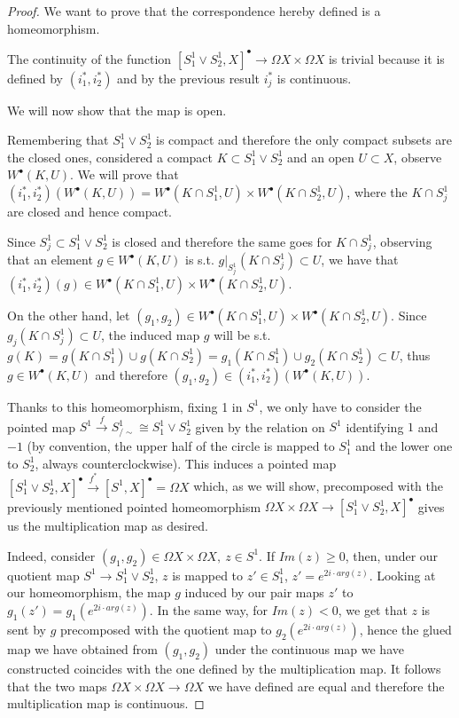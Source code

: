 \documentclass{article}
\begin{document}
\begin{proof}
	We want to prove that the correspondence hereby defined is a homeomorphism.
	
	The continuity of the function $[S^1_1\vee S^1_2,X]^{\bullet}\rightarrow\Omega X\times\Omega X$ is trivial because it is defined by $(i_1^*,i_2^*)$ and by the previous result $i_j^*$ is continuous.
	
	We will now show that the map is open.
	
	Remembering that $S^1_1\vee S^1_2$ is compact and therefore the only compact subsets are the closed ones, considered a compact $K\subset S^1_1\vee S^1_2$ and an open $U\subset X$, observe $W^{\bullet}(K,U)$. We will prove that $(i_1^*,i_2^*)(W^{\bullet}(K,U))=W^{\bullet}(K\cap S^1_1,U)\times W^{\bullet}(K\cap S^1_2,U)$, where the $K\cap S^1_j$ are closed and hence compact.
	
	Since $S^1_j\subset S^1_1\vee S^1_2$ is closed and therefore the same goes for $K\cap S^1_j$, observing that an element $g\in W^{\bullet}(K,U)$ is s.t. $g|_{S^1_j}(K\cap S_j^1)\subset U$, we have that $(i_1^*,i_2^*)(g)\in W^{\bullet}(K\cap S^1_1,U)\times W^{\bullet}(K\cap S^1_2,U)$.
	
	On the other hand, let $(g_1,g_2)\in W^{\bullet}(K\cap S^1_1,U)\times W^{\bullet}(K\cap S^1_2,U)$. Since $g_j(K\cap S^1_j)\subset U$, the induced map $g$ will be s.t. $g(K)=g(K\cap S^1_1)\cup g(K\cap S^1_2)=g_1(K\cap S^1_1)\cup g_2(K\cap S^1_2)\subset U$, thus $g\in W^{\bullet}(K,U)$ and therefore $(g_1,g_2)\in (i_1^*,i_2^*)(W^{\bullet}(K,U))$.
	
	Thanks to this homeomorphism, fixing 1 in $S^1$, we only have to consider the pointed map $S^1\xrightarrow{f} S^1_{/\sim}\cong S^1_1\vee S^1_2$ given by the relation on $S^1$ identifying $1$ and $-1$ (by convention, the upper half of the circle is mapped to $S^1_1$ and the lower one to $S^1_2$, always counterclockwise). This induces a pointed map $[S^1_1\vee S^1_2,X]^{\bullet}\xrightarrow{f^*}[S^1,X]^{\bullet}=\Omega X$ which, as we will show, precomposed with the previously mentioned pointed homeomorphism $\Omega X\times\Omega X\rightarrow [S^1_1\vee S^1_2,X]^{\bullet}$ gives us the multiplication map as desired.
	
	Indeed, consider $(g_1,g_2)\in\Omega X\times\Omega X,\ z\in S^1$. If $Im(z)\geq 0$, then, under our quotient map $S^1\rightarrow S^1_1\vee S^1_2$, $z$ is mapped to $z'\in S^1_1$, $z'=e^{2i\cdot arg(z)}$. Looking at our homeomorphism, the map $g$ induced by our pair maps $z'$ to $g_1(z')=g_1(e^{2i\cdot arg(z)})$. In the same way, for $Im(z)<0$, we get that $z$ is sent by $g$ precomposed with the quotient map to $g_2(e^{2i\cdot arg(z)})$, hence the glued map we have obtained from $(g_1,g_2)$ under the continuous map we have constructed coincides with the one defined by the multiplication map. It follows that the two maps $\Omega X\times\Omega X\rightarrow\Omega X$ we have defined are equal and therefore the multiplication map is continuous.
	

\end{proof}
\end{document}
